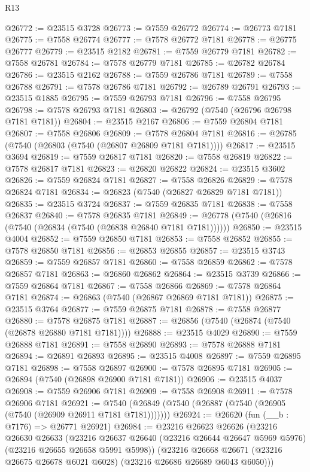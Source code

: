 \begin{lexlean}{R13}
\begin{coremodule}
@26772 := @23515 @3728
@26773 := @7559 @26772
@26774 := @26773 @7181
@26775 := @7558 @26774
@26777 := @7578 @26772 @7181
@26778 := @26775 @26777
@26779 := @23515 @2182
@26781 := @7559 @26779 @7181
@26782 := @7558 @26781
@26784 := @7578 @26779 @7181
@26785 := @26782 @26784
@26786 := @23515 @2162
@26788 := @7559 @26786 @7181
@26789 := @7558 @26788
@26791 := @7578 @26786 @7181
@26792 := @26789 @26791
@26793 := @23515 @1885
@26795 := @7559 @26793 @7181
@26796 := @7558 @26795
@26798 := @7578 @26793 @7181
@26803 := @26792 (@7540 (@26796 @26798 @7181 @7181))
@26804 := @23515 @2167
@26806 := @7559 @26804 @7181
@26807 := @7558 @26806
@26809 := @7578 @26804 @7181
@26816 := @26785 (@7540 (@26803 (@7540 (@26807 @26809 @7181 @7181))))
@26817 := @23515 @3694
@26819 := @7559 @26817 @7181
@26820 := @7558 @26819
@26822 := @7578 @26817 @7181
@26823 := @26820 @26822
@26824 := @23515 @3602
@26826 := @7559 @26824 @7181
@26827 := @7558 @26826
@26829 := @7578 @26824 @7181
@26834 := @26823 (@7540 (@26827 @26829 @7181 @7181))
@26835 := @23515 @3724
@26837 := @7559 @26835 @7181
@26838 := @7558 @26837
@26840 := @7578 @26835 @7181
@26849 := @26778 (@7540 (@26816 (@7540 (@26834 (@7540 (@26838 @26840 @7181 @7181))))))
@26850 := @23515 @4004
@26852 := @7559 @26850 @7181
@26853 := @7558 @26852
@26855 := @7578 @26850 @7181
@26856 := @26853 @26855
@26857 := @23515 @3743
@26859 := @7559 @26857 @7181
@26860 := @7558 @26859
@26862 := @7578 @26857 @7181
@26863 := @26860 @26862
@26864 := @23515 @3739
@26866 := @7559 @26864 @7181
@26867 := @7558 @26866
@26869 := @7578 @26864 @7181
@26874 := @26863 (@7540 (@26867 @26869 @7181 @7181))
@26875 := @23515 @3764
@26877 := @7559 @26875 @7181
@26878 := @7558 @26877
@26880 := @7578 @26875 @7181
@26887 := @26856 (@7540 (@26874 (@7540 (@26878 @26880 @7181 @7181))))
@26888 := @23515 @4029
@26890 := @7559 @26888 @7181
@26891 := @7558 @26890
@26893 := @7578 @26888 @7181
@26894 := @26891 @26893
@26895 := @23515 @4008
@26897 := @7559 @26895 @7181
@26898 := @7558 @26897
@26900 := @7578 @26895 @7181
@26905 := @26894 (@7540 (@26898 @26900 @7181 @7181))
@26906 := @23515 @4037
@26908 := @7559 @26906 @7181
@26909 := @7558 @26908
@26911 := @7578 @26906 @7181
@26921 := @7540 (@26849 (@7540 (@26887 (@7540 (@26905 (@7540 (@26909 @26911 @7181 @7181)))))))
@26924 := @26620 (fun (__b : @7176) => @26771 @26921)
@26984 := @23216
    @26623
    @26626
    (@23216
      @26630
      @26633
      (@23216 @26637 @26640 (@23216 @26644 @26647 @5969 @5976) (@23216 @26655 @26658 @5991 @5998))
      (@23216 @26668 @26671 (@23216 @26675 @26678 @6021 @6028) (@23216 @26686 @26689 @6043 @6050)))

\end{coremodule}
\end{lexlean}
